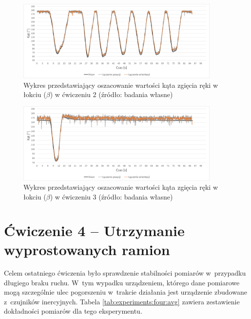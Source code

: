 \begin{figure}[!htb]
	\centering
	\includegraphics[width=0.9\textwidth]{images/200/angle.png}
	\caption{Wykres przedstawiający oszacowanie wartości kąta zgięcia ręki w łokciu ($\beta$) w ćwiczeniu 2 (źródło: badania własne)}
	\label{fig:experiments:second:angle}
\end{figure}
\begin{figure}[!htb]
	\centering
	\includegraphics[width=0.9\textwidth]{images/300/angle.png}
	\caption{Wykres przedstawiający oszacowanie wartości kąta zgięcia ręki w łokciu ($\beta$) w ćwiczeniu 3  (źródło: badania własne)}
	\label{fig:experiments:third:angle}
\end{figure}
																				
\section*{Ćwiczenie 4 -- Utrzymanie wyprostowanych ramion}
Celem ostatniego ćwiczenia było sprawdzenie stabilności pomiarów w~przypadku długiego braku ruchu. W~tym wypadku urządzeniem, którego dane pomiarowe mogą szczególnie ulec pogorszeniu w~trakcie działania jest urządzenie zbudowane z~czujników inercyjnych. Tabela \ref{tab:experiments:four:avg} zawiera zestawienie dokładności pomiarów dla tego eksperymentu.
																				
